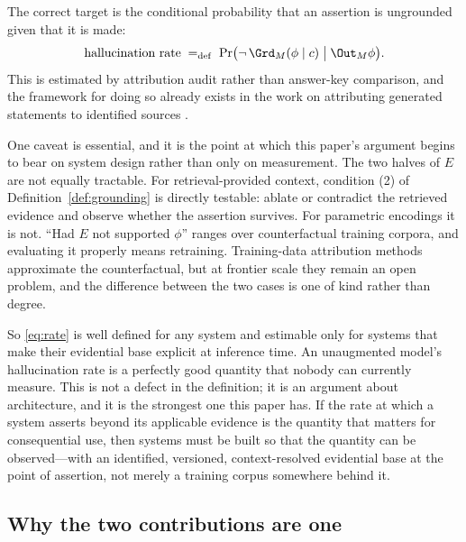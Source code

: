 The correct target is the conditional probability that an assertion is
ungrounded given that it is made:
\begin{equation}
  \text{hallucination rate} \;=_{\mathrm{def}}\;
  \Pr\bigl(\neg\,\Grd_M(\phi \mid c) \;\big|\; \Out_M \phi\bigr).
  \label{eq:rate}
\end{equation}
This is estimated by attribution audit rather than answer-key comparison, and
the framework for doing so already exists in the work on attributing generated
statements to identified sources \citep{rashkin2023}.

One caveat is essential, and it is the point at which this paper's argument
begins to bear on system design rather than only on measurement. The two halves
of $E$ are not equally tractable. For retrieval-provided context, condition (2)
of Definition~\ref{def:grounding} is directly testable: ablate or contradict the
retrieved evidence and observe whether the assertion survives. For parametric
encodings it is not. ``Had $E$ not supported $\phi$'' ranges over counterfactual
training corpora, and evaluating it properly means retraining.
Training-data attribution methods approximate the counterfactual, but at
frontier scale they remain an open problem, and the difference between the two
cases is one of kind rather than degree.

So \eqref{eq:rate} is well defined for any system and estimable only for systems
that make their evidential base explicit at inference time. An unaugmented
model's hallucination rate is a perfectly good quantity that nobody can currently
measure. This is not a defect in the definition; it is an argument about
architecture, and it is the strongest one this paper has. If the rate at which a
system asserts beyond its applicable evidence is the quantity that matters for
consequential use, then systems must be built so that the quantity can be
observed---with an identified, versioned, context-resolved evidential base at the
point of assertion, not merely a training corpus somewhere behind it.

\subsection{Why the two contributions are one}
\label{sec:unity}

